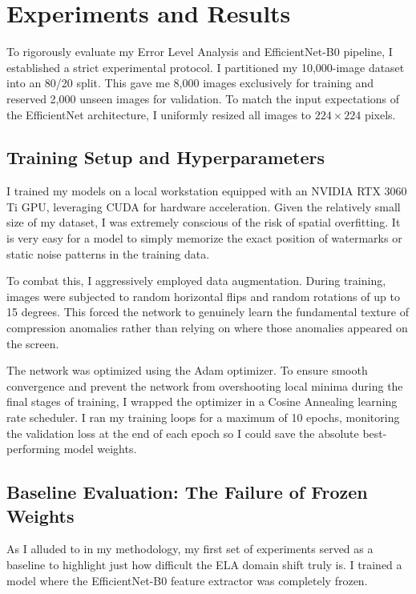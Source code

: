 \section{Experiments and Results}
\label{sec:experiments}

To rigorously evaluate my Error Level Analysis and EfficientNet-B0 pipeline, I established a strict experimental protocol. I partitioned my 10,000-image dataset into an 80/20 split. This gave me 8,000 images exclusively for training and reserved 2,000 unseen images for validation. To match the input expectations of the EfficientNet architecture, I uniformly resized all images to $224\times224$ pixels.

\subsection{Training Setup and Hyperparameters}

I trained my models on a local workstation equipped with an NVIDIA RTX 3060 Ti GPU, leveraging CUDA for hardware acceleration. Given the relatively small size of my dataset, I was extremely conscious of the risk of spatial overfitting. It is very easy for a model to simply memorize the exact position of watermarks or static noise patterns in the training data.

To combat this, I aggressively employed data augmentation. During training, images were subjected to random horizontal flips and random rotations of up to 15 degrees. This forced the network to genuinely learn the fundamental texture of compression anomalies rather than relying on where those anomalies appeared on the screen.

The network was optimized using the Adam optimizer. To ensure smooth convergence and prevent the network from overshooting local minima during the final stages of training, I wrapped the optimizer in a Cosine Annealing learning rate scheduler. I ran my training loops for a maximum of 10 epochs, monitoring the validation loss at the end of each epoch so I could save the absolute best-performing model weights.

\subsection{Baseline Evaluation: The Failure of Frozen Weights}

As I alluded to in my methodology, my first set of experiments served as a baseline to highlight just how difficult the ELA domain shift truly is. I trained a model where the EfficientNet-B0 feature extractor was completely frozen.

